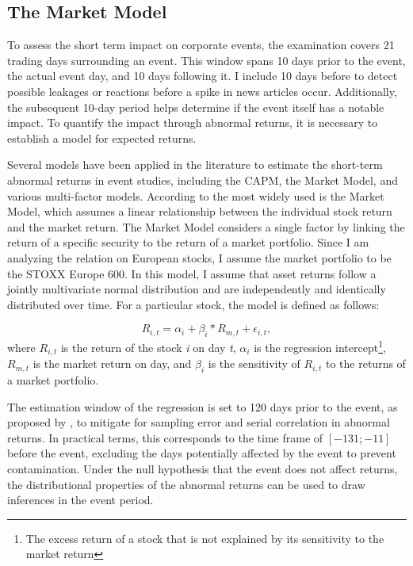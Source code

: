 \subsection{The Market Model}



To assess the short term impact on corporate events, the examination covers 21 trading days surrounding an event. This window spans 10 days prior to the event, the actual event day, and 10 days following it. I include 10 days before to detect possible leakages or reactions before a spike in news articles occur. Additionally, the subsequent 10-day period helps determine if the event itself has a notable impact. To quantify the impact through abnormal returns, it is necessary to establish a model for expected returns. 

Several models have been applied in the literature to estimate the short-term abnormal returns in event studies, including the CAPM, the Market Model, and various multi-factor models. According to \cite{holler2014event} the most widely used is the Market Model, which assumes a linear relationship between the individual stock return and the market return.  The Market Model considers a single factor by linking the return of a specific security to the return of a market portfolio. Since I am analyzing the relation on European stocks, I assume the market portfolio to be the STOXX Europe 600. In this model, I assume that asset returns follow a jointly multivariate normal distribution and are independently and identically distributed over time. For a particular stock, the model is defined as follows:

\begin{equation} \label{market_model}
    R_{i,t} = \alpha_i + \beta_i * R_{m,t} + \epsilon_{i,t},
\end{equation}
 where $R_{i,t}$ is the return of the stock \textit{i} on day \textit{t}, $\alpha_i$ is the regression intercept\footnote{The excess return of a stock that is not explained by its sensitivity to the market return}, $R_{m,t}$ is the market return on day, and
 $\beta_i$ is the sensitivity of $R_{i,t}$ to the returns of a market portfolio.
 
The estimation window of the regression is set to 120 days prior to the event, as proposed by \cite{Event_studies}, to mitigate for sampling error and serial correlation in abnormal returns. In practical terms, this corresponds to the time frame of $[-131;-11]$ before the event, excluding the days potentially affected by the event to prevent contamination. Under the null hypothesis that the event does not affect returns, the distributional properties of the abnormal returns can be used to draw inferences in the event period. 

